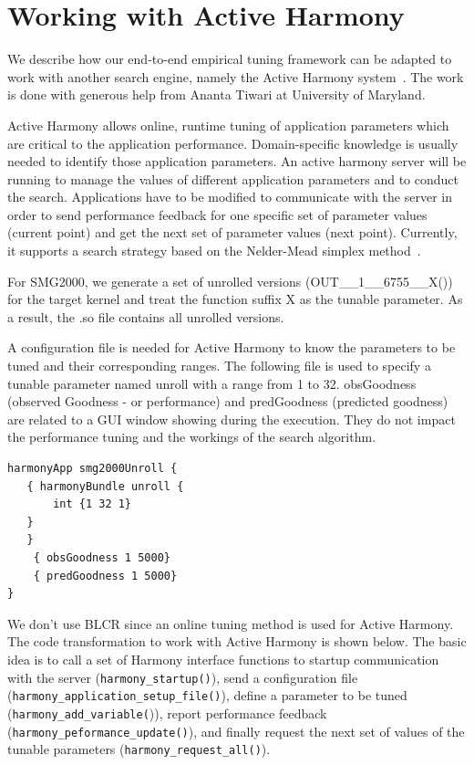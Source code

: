 \section{Working with Active Harmony}
We describe how our end-to-end empirical tuning framework can be adapted to work with another search engine, namely the Active Harmony system~\cite{TapusActive2002,ChungCase2006}. 
The work is done with generous help from Ananta Tiwari at University of
Maryland.

Active Harmony allows online, runtime tuning of application parameters which are critical to the application performance. 
Domain-specific knowledge is usually needed to identify those application parameters.
An active harmony server will be running to manage the values of different application parameters and to conduct the search.
Applications have to be modified to communicate with the server in order to send performance feedback for one specific set of parameter values (current point) and get the next set of parameter values (next point).
Currently, it supports a search strategy based on the Nelder-Mead simplex method~\cite{NelderSimplex1965}.

For SMG2000, we generate a set of unrolled versions (OUT\_\_1\_\_6755\_\_X()) for the target kernel and treat the function suffix X as the tunable parameter. 
As a result, the .so file contains all unrolled versions.

A configuration file is needed for Active Harmony to know the parameters to
be tuned and their corresponding ranges. 
The following file is used to specify a tunable parameter named unroll with a range from 1 to 32.
obsGoodness (observed Goodness - or performance) and predGoodness (predicted goodness) are related to a GUI window showing during the execution. 
They do not impact the performance tuning and the workings of the search algorithm. 
{\mySmallFontSize
\begin{verbatim}
harmonyApp smg2000Unroll {
   { harmonyBundle unroll {
       int {1 32 1}
   }
   }
    { obsGoodness 1 5000}
    { predGoodness 1 5000}
}
\end{verbatim}
}

We don't use BLCR since an online tuning method is used for Active Harmony. 
The code transformation to work with Active Harmony is shown below.
The basic idea is to call a set of Harmony interface functions to startup communication with the server (\lstinline{harmony_startup()}),
send a configuration file (\lstinline{harmony_application_setup_file()}), define a parameter to be tuned (\lstinline{harmony_add_variable(})),  report performance feedback (\lstinline{harmony_peformance_update()}), 
and finally request the next set of values of the tunable parameters (\lstinline{harmony_request_all()}).


